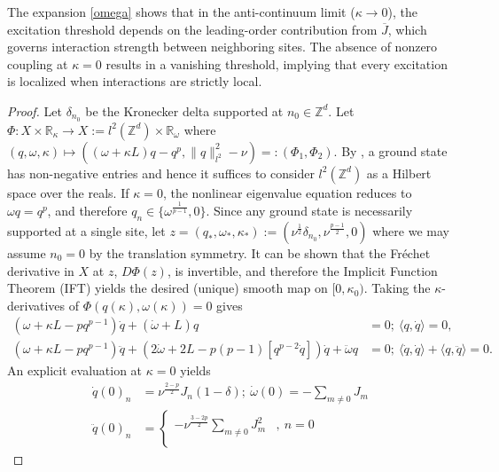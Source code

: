 \documentclass{article}
\numberwithin{equation}{section}
\begin{document}
The expansion \eqref{omega} shows that in the anti-continuum limit ($\kappa \rightarrow 0$), the excitation threshold depends on the leading-order contribution from $\overline{J}$, which governs interaction strength between neighboring sites. The absence of nonzero coupling at $\kappa = 0$ results in a vanishing threshold, implying that every excitation is localized when interactions are strictly local.



\begin{proof}
Let $\delta_{n_0}$ be the Kronecker delta supported at $n_0 \in \mathbb{Z}^d$. Let $\Phi: X \times \mathbb{R}_{\kappa} \rightarrow X:=l^2(\mathbb{Z}^d) \times \mathbb{R}_{\omega}$ where $(q,\omega,\kappa) \mapsto ((\omega + \kappa L)q - q^p, \| q \|_{l^2}^2 - \nu)=: (\Phi_1,\Phi_2)$. By , a ground state has non-negative entries and hence it suffices to consider $l^2(\mathbb{Z}^d)$ as a Hilbert space over the reals. If $\kappa = 0$, the nonlinear eigenvalue equation reduces to $\omega q = q^p$, and therefore $q_n \in \{\omega^{\frac{1}{p-1}},0\}$. Since any ground state is necessarily supported at a single site, let $z = (q_*,\omega_*,\kappa_*) := (\nu^{\frac{1}{2}} \delta_{n_0},
\nu^{\frac{p-1}{2}},0)$ where we may assume $n_0 = 0$ by the translation symmetry. It can be shown that the Fr\'{e}chet derivative in $X$ at $z$, $D\Phi(z)$, is invertible, and therefore the Implicit Function Theorem (IFT) yields the desired (unique) smooth map on $[0,\kappa_0)$. Taking the $\kappa$-derivatives of $\Phi(q(\kappa),\omega(\kappa)) = 0$ gives 
\begin{equation*}
\begin{split}
    (\omega + \kappa L - pq^{p-1}) \dot{q} + (\dot{\omega} + L)q &= 0;\ \langle q, \dot{q} \rangle =0,\\
    (\omega + \kappa L -pq^{p-1}) \ddot{q} + (2\dot{\omega} + 2L - p(p-1)[q^{p-2}\dot{q}])\dot{q} + \ddot{\omega} q &= 0;\ \langle \dot{q},\dot{q} \rangle + \langle q, \ddot{q}\rangle = 0.
\end{split}
\end{equation*}
An explicit evaluation at $\kappa = 0$ yields
\begin{equation*}
\begin{split}
    \dot{q}(0)_n &= \nu^{\frac{2-p}{2}} J_{n}(1-\delta);\ \dot{\omega}(0) = -\sum_{m \neq 0} J_{m}\\
    \ddot{q}(0)_n &= 
    \begin{cases}
            -\nu^{\frac{3-2p}{2}} \sum\limits_{m \neq 0} J_{m}^2
            & ,\ n = 0\\

\end{cases}
\end{split}
\end{equation*}
\end{proof}
\end{document}
